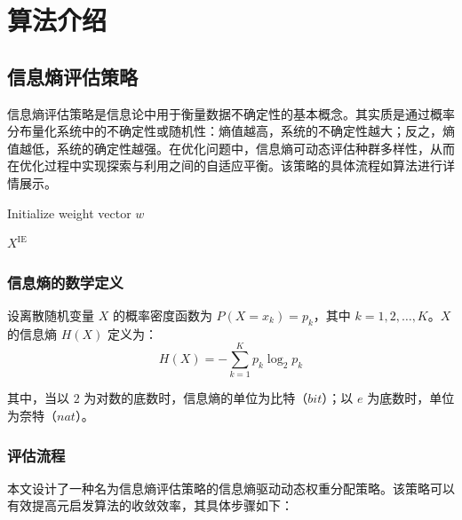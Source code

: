 \documentclass{wzuthesis}
\begin{document}
\section{算法介绍}

\subsection{信息熵评估策略}
信息熵评估策略是信息论中用于衡量数据不确定性的基本概念。其实质是通过概率分布量化系统中的不确定性或随机性：熵值越高，系统的不确定性越大；反之，熵值越低，系统的确定性越强。在优化问题中，信息熵可动态评估种群多样性，从而在优化过程中实现探索与利用之间的自适应平衡。该策略的具体流程如算法进行详情展示。
\begin{algorithm}[htbp]
    \caption{Information Entropy Evaluation Strategy}
    \label{alg:entropy}
    \SetAlgoLined
    
    Initialize weight vector $w$ \;

    \Return $X^{\text{IE}}$ \
\end{algorithm}
\subsubsection{信息熵的数学定义}
设离散随机变量 $X$ 的概率密度函数为 $P(X = {x}_{k})  = {p}_{k}$，其中 $k = 1,2,\ldots ,K$。$X$ 的信息熵 $H(X)$ 定义为：
\begin{equation}
    H(X) = -\sum_{k=1}^K p_k \log_2 p_k
\label{eq:information entropy define}    
\end{equation}

其中，当以 $2$ 为对数的底数时，信息熵的单位为比特（$bit$）；以 $e$ 为底数时，单位为奈特（$nat$）。
\subsubsection{评估流程}
本文设计了一种名为信息熵评估策略的信息熵驱动动态权重分配策略。该策略可以有效提高元启发算法的收敛效率，其具体步骤如下：
\end{document}
